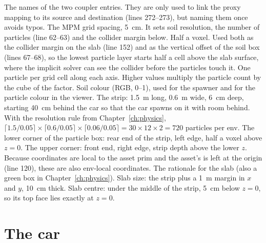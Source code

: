 
\begin{explain}
 The names of the two coupler entries. They are only used to
  link the proxy mapping to its source and destination (lines 272--273), but
  naming them once avoids typos.
 The MPM grid spacing, 5~cm. It sets soil resolution, the number of
  particles (line 62--63) and the collider margin below.
 Half a voxel. Used both as the collider margin on the slab (line 152)
  and as the vertical offset of the soil box (lines 67--68), so the lowest
  particle layer starts half a cell above the slab surface, where the
  implicit solver can see the collider before the particles touch it.
 One particle per grid cell along each axis. Higher values multiply
  the particle count by the cube of the factor.
 Soil colour (RGB, 0--1), used for the spawner and for the particle
  colour in the viewer.
 The strip: 1.5~m long, 0.6~m wide, 6~cm deep, starting 40~cm
  behind the car so that the car spawns on it with room behind. With the
  resolution rule from Chapter~\ref{ch:physics},
  $\lceil 1.5/0.05\rceil \times \lceil 0.6/0.05\rceil \times \lceil 0.06/0.05\rceil = 30\times12\times2 = 720$
  particles per env.
 The lower corner of the particle box: rear end of the strip, left
  edge, half a voxel above $z=0$.
 The upper corner: front end, right edge, strip depth above the lower
  $z$. Because  coordinates are local to the asset prim and
  the asset's  is left at the origin (line 120), these are
  also env-local coordinates.
 The rationale for the slab (also a green box in
  Chapter~\ref{ch:physics}).
 Slab size: the strip plus a 1~m margin in $x$ and $y$, 10~cm thick.
 Slab centre: under the middle of the strip, 5~cm below $z=0$, so its
  top face lies exactly at $z=0$.
\end{explain}

\section{The car}


